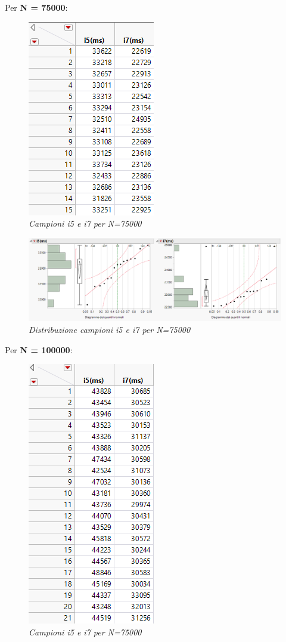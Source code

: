 Per \textbf{N = 75000}:
\begin{figure}[H]
	\centering
	\includegraphics{img/hw0/75000.png}
	\caption{\textit{Campioni i5 e i7 per N=75000}}
\end{figure}
\begin{figure}[H]
	\centering
	\includegraphics[width=1.1\textwidth]{img/hw0/75000distr.png}
	\caption{\textit{Distribuzione campioni i5 e i7 per N=75000}}
\end{figure}
\newpage
Per \textbf{N = 100000}:
\begin{figure}[H]
	\centering
	\includegraphics{img/hw0/100000distr.png}
	\caption{\textit{Campioni i5 e i7 per N=75000}}
\end{figure}
